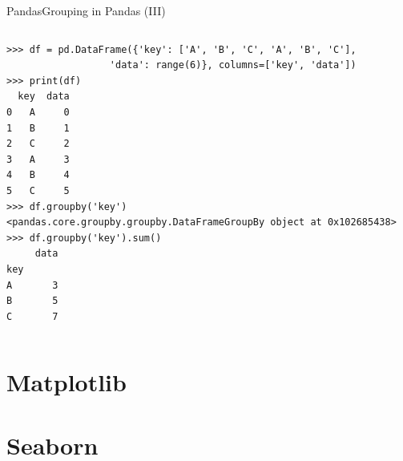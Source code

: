 \documentclass[10pt,compress]{beamer} %
\begin{document}
\begin{frame}[fragile]{Pandas}{Grouping in Pandas (III)}
	\vspace{-0.5cm}
	\begin{columns}
 	   \column{\textwidth}
		\begin{exampleblock}{}
		\vspace{-0.2cm} 
			\begin{lstlisting}
>>> df = pd.DataFrame({'key': ['A', 'B', 'C', 'A', 'B', 'C'],
                  'data': range(6)}, columns=['key', 'data'])
>>> print(df)
  key  data
0   A     0
1   B     1
2   C     2
3   A     3
4   B     4
5   C     5
>>> df.groupby('key')
<pandas.core.groupby.groupby.DataFrameGroupBy object at 0x102685438>
>>> df.groupby('key').sum()
     data
key      
A       3
B       5
C       7
			\end{lstlisting}
			\vspace{-0.2cm} 
		\end{exampleblock}
	\end{columns}
\end{frame}



\section{Matplotlib}
\section{Seaborn}



	
\end{document}
